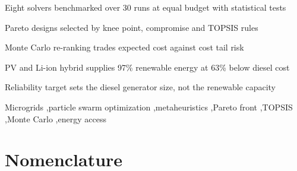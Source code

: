 \documentclass[final,3p,times]{elsarticle}
\begin{document}
\begin{frontmatter}
\begin{highlights}
\item Eight solvers benchmarked over 30 runs at equal budget with statistical tests
\item Pareto designs selected by knee point, compromise and TOPSIS rules
\item Monte Carlo re-ranking trades expected cost against cost tail risk
\item PV and Li-ion hybrid supplies 97\% renewable energy at 63\% below diesel cost
\item Reliability target sets the diesel generator size, not the renewable capacity
\end{highlights}

\begin{keyword}



Microgrids \sep particle swarm optimization \sep metaheuristics \sep Pareto front \sep TOPSIS \sep Monte Carlo \sep energy access

\end{keyword}

\end{frontmatter}

\section*{Nomenclature}
\end{document}
